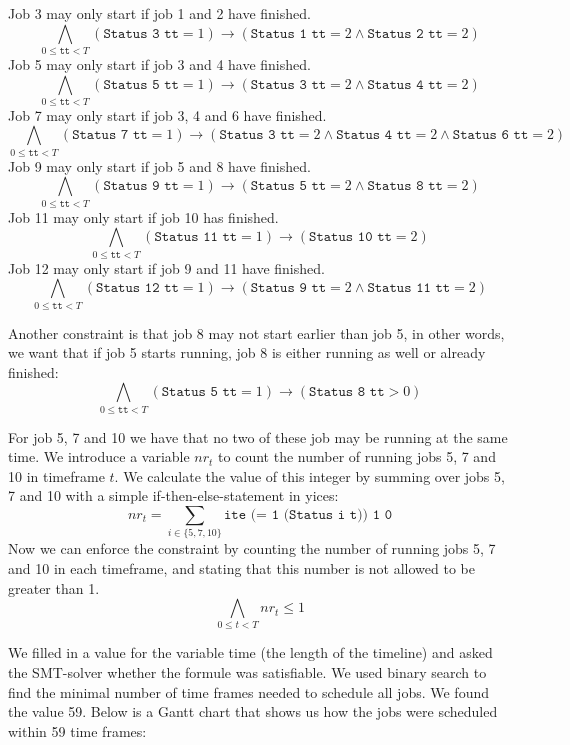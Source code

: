 \documentclass[12pt]{article}
\begin{document}
Job 3 may only start if job 1 and 2 have finished.
\[ \bigwedge_{0 \le \texttt{tt} < T} (\texttt{Status 3 tt} = 1) \rightarrow (\texttt{Status 1 tt} = 2 \wedge \texttt{Status 2 tt} = 2) \]
Job 5 may only start if job 3 and 4 have finished.
\[ \bigwedge_{0 \le \texttt{tt} < T} (\texttt{Status 5 tt} = 1) \rightarrow (\texttt{Status 3 tt} = 2 \wedge \texttt{Status 4 tt} = 2) \]
Job 7 may only start if job 3, 4 and 6 have finished.
\[ \bigwedge_{0 \le \texttt{tt} < T} (\texttt{Status 7 tt} = 1) \rightarrow (\texttt{Status 3 tt} = 2 \wedge \texttt{Status 4 tt} = 2 \wedge \texttt{Status 6 tt} = 2) \]
Job 9 may only start if job 5 and 8 have finished.
\[ \bigwedge_{0 \le \texttt{tt} < T} (\texttt{Status 9 tt} = 1) \rightarrow (\texttt{Status 5 tt} = 2 \wedge \texttt{Status 8 tt} = 2) \]
Job 11 may only start if job 10 has finished.
\[ \bigwedge_{0 \le \texttt{tt} < T} (\texttt{Status 11 tt} = 1) \rightarrow (\texttt{Status 10 tt} = 2) \]
Job 12 may only start if job 9 and 11 have finished.
\[ \bigwedge_{0 \le \texttt{tt} < T} (\texttt{Status 12 tt} = 1) \rightarrow (\texttt{Status 9 tt} = 2 \wedge \texttt{Status 11 tt} = 2) \]

Another constraint is that job 8 may not start earlier than job 5, in other words, we want that if job 5 starts running, job 8 is either running as well or already finished:
\[ \bigwedge_{0 \le \texttt{tt} < T} (\texttt{Status 5 tt} = 1) \rightarrow (\texttt{Status 8 tt} > 0) \]

For job 5, 7 and 10 we have that no two of these job may be running at the same time. 
We introduce a variable $nr_t$ to count the number of running jobs 5, 7 and 10 in timeframe $t$.
We calculate the value of this integer by summing over jobs 5, 7 and 10 with a simple if-then-else-statement in yices: 
\[ nr_t = \sum_{i \in \{5,7,10\}} \texttt{ite (= 1 (Status i t)) 1 0} \]
Now we can enforce the constraint by counting the number of running jobs 5, 7 and 10 in each timeframe, 
and stating that this number is not allowed to be greater than 1. 
\[ \bigwedge_{0 \le t < T} nr_t \le 1\]

We filled in a value for the variable time (the length of the timeline) 
and asked the SMT-solver whether the formule was satisfiable. 
We used binary search to find the minimal number of time frames needed to schedule all jobs. 
We found the value 59. 
Below is a Gantt chart that shows us how the jobs were scheduled within 59 time frames:
\end{document}
